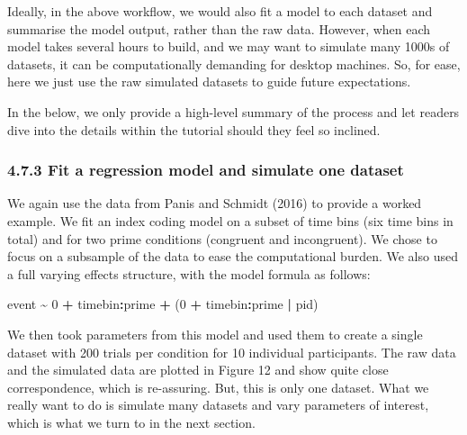 \documentclass[
  man, donotrepeattitle,floatsintext]{apa6}
\newenvironment{Shaded}{\begin{snugshade}}{\end{snugshade}}
\newcommand{\DecValTok}[1]{\textcolor[rgb]{0.00,0.00,0.81}{#1}}
\newcommand{\NormalTok}[1]{#1}
\newcommand{\SpecialCharTok}[1]{\textcolor[rgb]{0.81,0.36,0.00}{\textbf{#1}}}
\begin{document}
Ideally, in the above workflow, we would also fit a model to each dataset and summarise the model output, rather than the raw data. However, when each model takes several hours to build, and we may want to simulate many 1000s of datasets, it can be computationally demanding for desktop machines. So, for ease, here we just use the raw simulated datasets to guide future expectations.

In the below, we only provide a high-level summary of the process and let readers dive into the details within the tutorial should they feel so inclined.

\subsubsection{4.7.3 Fit a regression model and simulate one dataset}\label{fit-a-regression-model-and-simulate-one-dataset}

We again use the data from Panis and Schmidt (2016) to provide a worked example.
We fit an index coding model on a subset of time bins (six time bins in total) and for two prime conditions (congruent and incongruent). We chose to focus on a subsample of the data to ease the computational burden. We also used a full varying effects structure, with the model formula as follows:

\begin{Shaded}
\begin{Highlighting}[]
\NormalTok{event }\SpecialCharTok{\textasciitilde{}} \DecValTok{0} \SpecialCharTok{+}\NormalTok{ timebin}\SpecialCharTok{:}\NormalTok{prime }\SpecialCharTok{+}\NormalTok{ (}\DecValTok{0} \SpecialCharTok{+}\NormalTok{ timebin}\SpecialCharTok{:}\NormalTok{prime }\SpecialCharTok{|}\NormalTok{ pid)}
\end{Highlighting}
\end{Shaded}

We then took parameters from this model and used them to create a single dataset with 200 trials per condition for 10 individual participants. The raw data and the simulated data are plotted in Figure 12 and show quite close correspondence, which is re-assuring. But, this is only one dataset. What we really want to do is simulate many datasets and vary parameters of interest, which is what we turn to in the next section.
\end{document}
